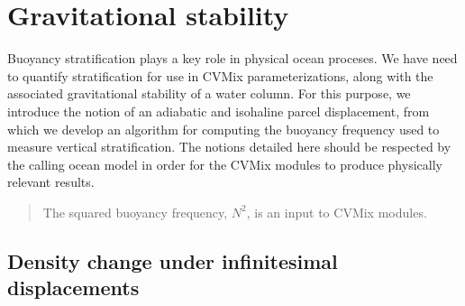 \section{Gravitational stability}
\label{section:buoyancy-frequency-elements}

Buoyancy stratification plays a key role in physical ocean proceses.
We have need to quantify stratification for use in CVMix
parameterizations, along with the associated gravitational stability
of a water column.  For this purpose, we introduce the notion of an
adiabatic and isohaline parcel displacement, from which we develop an
algorithm for computing the buoyancy frequency used to measure
vertical stratification.  The notions detailed here should be
respected by the calling ocean model in order for the CVMix modules to
produce physically relevant results.
\begin{mdframed}[backgroundcolor=lightgray!50]
\begin{quote}
  {\sf The squared buoyancy frequency, $N^2$, is an input to CVMix
    modules.}
\end{quote}
\end{mdframed}


\subsection{Density change under infinitesimal displacements}


